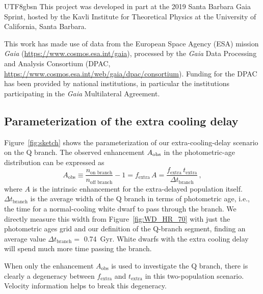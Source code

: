 \documentclass[twocolumn, times, trackchanges]{aastex63_bren}
\begin{document}
\begin{CJK*}{UTF8}{gbsn}
This project was developed in part at the 2019 Santa Barbara Gaia Sprint, hosted by the Kavli Institute for Theoretical Physics at the University of California, Santa Barbara.

This work has made use of data from the European Space Agency (ESA) mission
{\it Gaia} (\url{https://www.cosmos.esa.int/gaia}), processed by the {\it Gaia}
Data Processing and Analysis Consortium (DPAC,
\url{https://www.cosmos.esa.int/web/gaia/dpac/consortium}). Funding for the DPAC
has been provided by national institutions, in particular the institutions
participating in the {\it Gaia} Multilateral Agreement.



\begin{appendix}

\section{Parameterization of the extra cooling delay}
\label{app:extra-cooling-delay scenario}

Figure~\ref{fig:sketch} shows the parameterization of our extra-cooling-delay scenario on the Q branch. The observed enhancement $A_{\rm obs}$ in the photometric-age distribution can be expressed as
\begin{equation}
    \label{eq:enhancement}
    A_\text{obs}\equiv \frac{n_\text{on branch}}{n_\text{off branch}}-1=f_\text{extra}\,A = \frac{f_\text{extra}\,t_\text{extra}}{\Delta t_\text{branch}}\,,
\end{equation}
where $A$ is the intrinsic enhancement for the extra-delayed population itself. $\Delta t_\text{branch}$ is the average width of the Q branch in terms of photometric age, i.e., the time for a normal-cooling white dwarf to pass through the branch. We directly measure this width from Figure~\ref{fig:WD_HR_70} with just the photometric ages grid and our definition of the Q-branch segment, finding an average value $\Delta t_\text{branch}=$ 0.74~Gyr. White dwarfs with the extra cooling delay will spend much more time passing the branch. 

When only the enhancement $A_\text{obs}$ is used to investigate the Q branch, there is clearly a degeneracy between $f_\text{extra}$ and $t_\text{extra}$ in this two-population scenario. Velocity information helps to break this degeneracy.


\end{appendix}
\end{CJK*}
\end{document}
